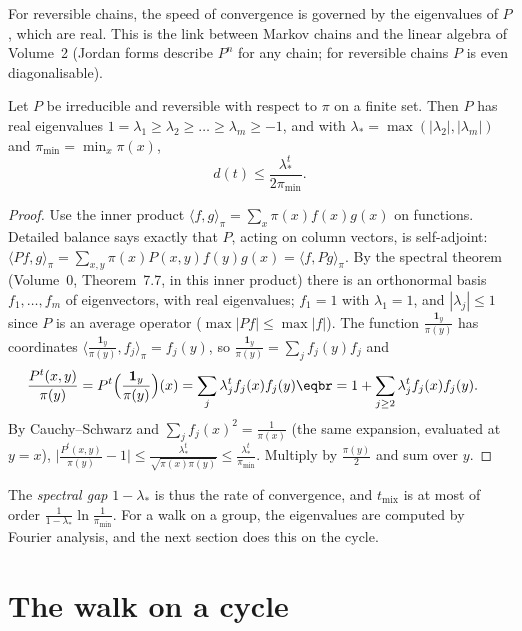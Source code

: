 For reversible chains, the speed of convergence is governed by the eigenvalues of $P$, which are real. This is the link
between Markov chains and the linear algebra of Volume~2 (Jordan forms describe $P^n$ for any chain; for reversible
chains $P$ is even diagonalisable).

\begin{proposition}\label{prop:spectral}
Let $P$ be irreducible and reversible with respect to $\pi$ on a finite set. Then $P$ has real eigenvalues $1=\lambda_1\ge\lambda_2\ge\dots\ge\lambda_m\ge-1$,
and with $\lambda_*=\max(|\lambda_2|,|\lambda_m|)$ and $\pi_{\min}=\min_x\pi(x)$,
\[
d(t)\le\frac{\lambda_*^t}{2\pi_{\min}}.
\]
\end{proposition}
\begin{proof}
Use the inner product $\langle f,g\rangle_\pi=\sum_x\pi(x)f(x)g(x)$ on functions. Detailed balance says exactly that $P$, acting on column vectors, is
self-adjoint: $\langle Pf,g\rangle_\pi=\sum_{x,y}\pi(x)P(x,y)f(y)g(x)=\langle f,Pg\rangle_\pi$. By the spectral theorem (Volume~0, Theorem~7.7, in this inner product)
there is an orthonormal basis $f_1,\dots,f_m$ of eigenvectors, with real eigenvalues; $f_1=1$ with $\lambda_1=1$, and $|\lambda_j|\le1$ since $P$ is an
average operator ($\max|Pf|\le\max|f|$). The function $\frac{\mathbf 1_y}{\pi(y)}$ has coordinates $\langle\frac{\mathbf 1_y}{\pi(y)},f_j\rangle_\pi=f_j(y)$, so $\frac{\mathbf 1_y}{\pi(y)}=\sum_jf_j(y)f_j$ and
\[
\begin{aligned}\frac{P^t(x,y)}{\pi(y)}&=P^t\Bigl(\frac{\mathbf 1_y}{\pi(y)}\Bigr)(x)=\sum_j\lambda_j^tf_j(x)f_j(y)\eqbr=1+\sum_{j\ge2}\lambda_j^tf_j(x)f_j(y).\end{aligned}
\]
By Cauchy--Schwarz and $\sum_jf_j(x)^2=\frac1{\pi(x)}$ (the same expansion, evaluated at $y=x$), $\bigl|\frac{P^t(x,y)}{\pi(y)}-1\bigr|\le\frac{\lambda_*^t}{\sqrt{\pi(x)\pi(y)}}\le\frac{\lambda_*^t}{\pi_{\min}}$.
Multiply by $\frac{\pi(y)}2$ and sum over $y$.
\end{proof}

The \emph{spectral gap} $1-\lambda_*$ is thus the rate of convergence, and $t_{\mathrm{mix}}$ is at most of order $\frac{1}{1-\lambda_*}\ln\frac1{\pi_{\min}}$. For a
walk on a group, the eigenvalues are computed by Fourier analysis, and the next section does this on the cycle.

\section{The walk on a cycle}

